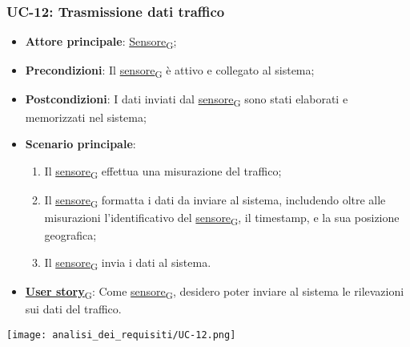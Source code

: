 \subsubsection{UC-12: Trasmissione dati traffico}
\begin{itemize}
	\item \textbf{Attore principale}: \href{https://7last.github.io/docs/rtb/documentazione-interna/glossario\#sensore}{Sensore\textsubscript{G}};
	\item \textbf{Precondizioni}: Il \href{https://7last.github.io/docs/rtb/documentazione-interna/glossario\#sensore}{sensore\textsubscript{G}} è attivo e collegato al sistema;
	\item \textbf{Postcondizioni}: I dati inviati dal \href{https://7last.github.io/docs/rtb/documentazione-interna/glossario\#sensore}{sensore\textsubscript{G}} sono stati elaborati e memorizzati nel sistema;
	\item \textbf{Scenario principale}:
	      \begin{enumerate}
		      \item Il \href{https://7last.github.io/docs/rtb/documentazione-interna/glossario\#sensore}{sensore\textsubscript{G}} effettua una misurazione del traffico;
		      \item Il \href{https://7last.github.io/docs/rtb/documentazione-interna/glossario\#sensore}{sensore\textsubscript{G}} formatta i dati da inviare al sistema, includendo oltre alle misurazioni l'identificativo del \href{https://7last.github.io/docs/rtb/documentazione-interna/glossario\#sensore}{sensore\textsubscript{G}},
		            il timestamp, e la sua posizione geografica;
		      \item Il \href{https://7last.github.io/docs/rtb/documentazione-interna/glossario\#sensore}{sensore\textsubscript{G}} invia i dati al sistema.
	      \end{enumerate}
	\item \href{https://7last.github.io/docs/rtb/documentazione-interna/glossario\#user-story}{\textbf{User story}\textsubscript{G}}: Come \href{https://7last.github.io/docs/rtb/documentazione-interna/glossario\#sensore}{sensore\textsubscript{G}}, desidero poter inviare al sistema le rilevazioni sui dati del traffico.
\end{itemize}

\begin{center}
	\texttt{[image: analisi\_dei\_requisiti/UC-12.png]}
\end{center}

